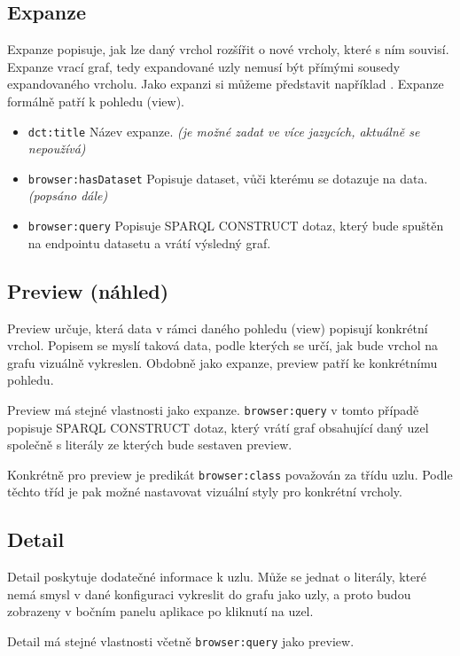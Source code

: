 \subsection{Expanze} \label{pozadavky-expansion}
Expanze popisuje, jak lze daný vrchol rozšířit o nové vrcholy, které s ním souvisí. Expanze vrací graf, tedy expandované uzly nemusí být přímými sousedy expandovaného vrcholu. Jako expanzi si můžeme představit například . Expanze formálně patří k pohledu (view).
\begin{itemize}
    \item \texttt{dct:title} Název expanze. \textit{(je možné zadat ve více jazycích, aktuálně se nepoužívá)}
    \item \texttt{browser:hasDataset} Popisuje dataset, vůči kterému se dotazuje na data. \textit{(popsáno dále)}
    \item \texttt{browser:query} Popisuje SPARQL CONSTRUCT dotaz, který bude spuštěn na endpointu datasetu a vrátí výsledný graf.
\end{itemize}

\subsection{Preview (náhled)} \label{pozadavky-preview}
Preview určuje, která data v rámci daného pohledu (view) popisují konkrétní vrchol. Popisem se myslí taková data, podle kterých se určí, jak bude vrchol na grafu vizuálně vykreslen. Obdobně jako expanze, preview patří ke konkrétnímu pohledu.

Preview má stejné vlastnosti jako expanze. \texttt{browser:query} v tomto případě popisuje SPARQL CONSTRUCT dotaz, který vrátí graf obsahující daný uzel společně s literály ze kterých bude sestaven preview.

Konkrétně pro preview je predikát \texttt{browser:class} považován za třídu uzlu. Podle těchto tříd je pak možné nastavovat vizuální styly pro konkrétní vrcholy.

\subsection{Detail} \label{pozadavky-detail}
Detail poskytuje dodatečné informace k uzlu. Může se jednat o literály, které nemá smysl v dané konfiguraci vykreslit do grafu jako uzly, a proto budou zobrazeny v bočním panelu aplikace po kliknutí na uzel.

Detail má stejné vlastnosti včetně \texttt{browser:query} jako preview.

